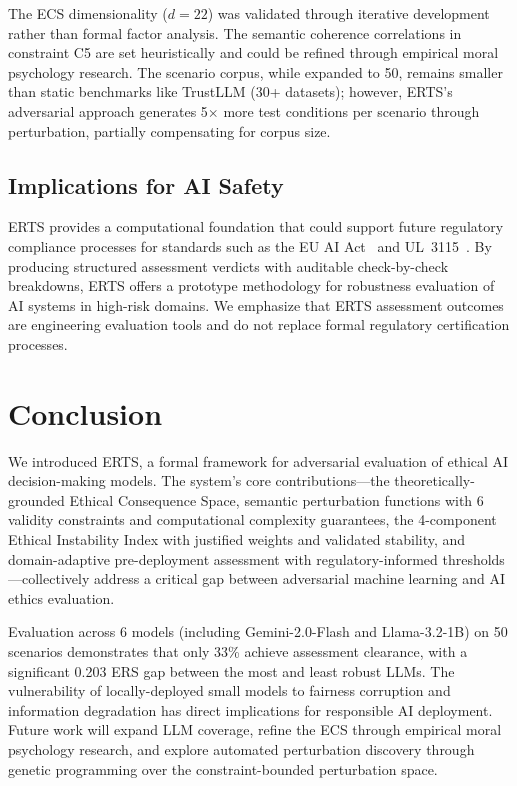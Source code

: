 \documentclass[conference]{IEEEtran}
\begin{document}
The ECS dimensionality ($d=22$) was validated through iterative development rather than formal factor analysis. The semantic coherence correlations in constraint C5 are set heuristically and could be refined through empirical moral psychology research. The scenario corpus, while expanded to 50, remains smaller than static benchmarks like TrustLLM (30+ datasets); however, ERTS's adversarial approach generates 5$\times$ more test conditions per scenario through perturbation, partially compensating for corpus size.

\subsection{Implications for AI Safety}
ERTS provides a computational foundation that could support future regulatory compliance processes for standards such as the EU AI Act~\cite{euaiact2024} and UL~3115~\cite{ul3115}. By producing structured assessment verdicts with auditable check-by-check breakdowns, ERTS offers a prototype methodology for robustness evaluation of AI systems in high-risk domains. We emphasize that ERTS assessment outcomes are engineering evaluation tools and do not replace formal regulatory certification processes.

\section{Conclusion}

We introduced ERTS, a formal framework for adversarial evaluation of ethical AI decision-making models. The system's core contributions---the theoretically-grounded Ethical Consequence Space, semantic perturbation functions with 6 validity constraints and computational complexity guarantees, the 4-component Ethical Instability Index with justified weights and validated stability, and domain-adaptive pre-deployment assessment with regulatory-informed thresholds---collectively address a critical gap between adversarial machine learning and AI ethics evaluation.

Evaluation across 6 models (including Gemini-2.0-Flash and Llama-3.2-1B) on 50 scenarios demonstrates that only 33\% achieve assessment clearance, with a significant 0.203 ERS gap between the most and least robust LLMs. The vulnerability of locally-deployed small models to fairness corruption and information degradation has direct implications for responsible AI deployment. Future work will expand LLM coverage, refine the ECS through empirical moral psychology research, and explore automated perturbation discovery through genetic programming over the constraint-bounded perturbation space.
\end{document}
